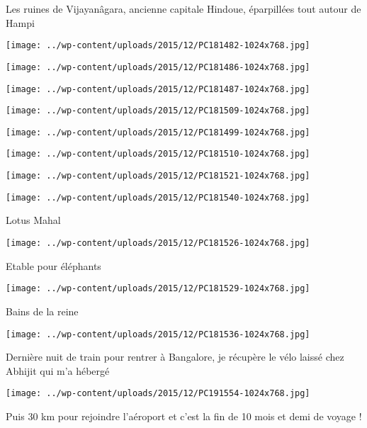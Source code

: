  \newline
 Les ruines de Vijayanâgara, ancienne capitale Hindoue, éparpillées tout autour de Hampi \newline
 \newline
\centerline{\texttt{[image: ../wp-content/uploads/2015/12/PC181482-1024x768.jpg]} } 
 \newline
 \newline
\centerline{\texttt{[image: ../wp-content/uploads/2015/12/PC181486-1024x768.jpg]} } 
 \newline
 \newline
\centerline{\texttt{[image: ../wp-content/uploads/2015/12/PC181487-1024x768.jpg]} } 
 \newline
 \newline
\centerline{\texttt{[image: ../wp-content/uploads/2015/12/PC181509-1024x768.jpg]} } 
 \newline
 \newline
\centerline{\texttt{[image: ../wp-content/uploads/2015/12/PC181499-1024x768.jpg]} } 
 \newline
 \newline
\centerline{\texttt{[image: ../wp-content/uploads/2015/12/PC181510-1024x768.jpg]} } 
 \newline
 \newline
\centerline{\texttt{[image: ../wp-content/uploads/2015/12/PC181521-1024x768.jpg]} } 
 \newline
 \newline
\centerline{\texttt{[image: ../wp-content/uploads/2015/12/PC181540-1024x768.jpg]} } 
 \newline
 Lotus Mahal \newline
 \newline
\centerline{\texttt{[image: ../wp-content/uploads/2015/12/PC181526-1024x768.jpg]} } 
 \newline
 Etable pour éléphants \newline
 \newline
\centerline{\texttt{[image: ../wp-content/uploads/2015/12/PC181529-1024x768.jpg]} } 
 \newline
 Bains de la reine \newline
 \newline
\centerline{\texttt{[image: ../wp-content/uploads/2015/12/PC181536-1024x768.jpg]} } 
 \newline
 Dernière nuit de train pour rentrer à Bangalore, je récupère le vélo laissé chez Abhijit qui m'a hébergé \newline
 \newline
\centerline{\texttt{[image: ../wp-content/uploads/2015/12/PC191554-1024x768.jpg]} } 
 \newline
 Puis 30 km pour rejoindre l'aéroport et c'est la fin de 10 mois et demi de voyage ! \newline

\newpage
 
